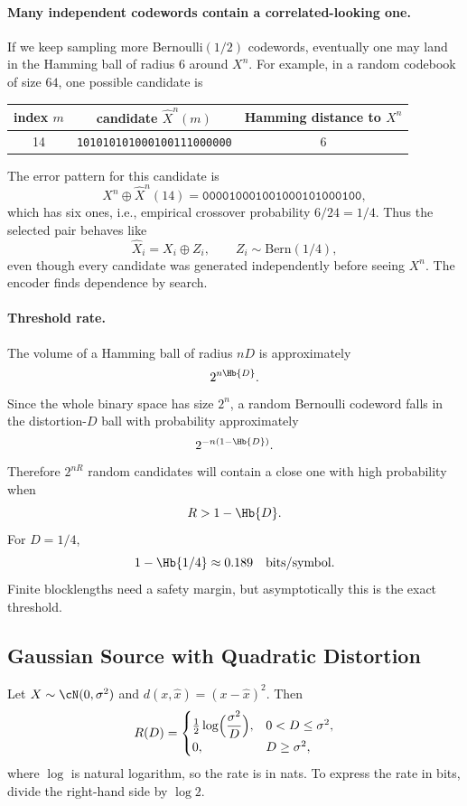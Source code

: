 \paragraph{Many independent codewords contain a correlated-looking one.}
If we keep sampling more Bernoulli$(1/2)$ codewords, eventually one may land in the Hamming ball of radius $6$ around $X^n$.
For example, in a random codebook of size $64$, one possible candidate is
\begin{center}
\begin{tabular}{c|c|c}
index $m$ & candidate $\widehat X^n(m)$ & Hamming distance to $X^n$ \\
\hline
14 & \texttt{101010101000100111000000} & 6
\end{tabular}
\end{center}
The error pattern for this candidate is
\[
X^n\oplus \widehat X^n(14)
=	\texttt{000010001001000101000100},
\]
which has six ones, i.e., empirical crossover probability $6/24=1/4$.
Thus the selected pair behaves like
\[
    \widehat X_i = X_i\oplus Z_i,
    \qquad Z_i\sim\mathrm{Bern}(1/4),
\]
even though every candidate was generated independently before seeing $X^n$.
The encoder finds dependence by search.

\paragraph{Threshold rate.}
The volume of a Hamming ball of radius $nD$ is approximately
\[
    2^{n\Hb{D}}.
\]
Since the whole binary space has size $2^n$, a random Bernoulli codeword falls in the distortion-$D$ ball with probability approximately
\[
    2^{-n(1-\Hb{D})}.
\]
Therefore $2^{nR}$ random candidates will contain a close one with high probability when
\[
    R>1-\Hb{D}.
\]
For $D=1/4$,
\[
    1-\Hb{1/4}\approx 0.189\quad\text{bits/symbol}.
\]
Finite blocklengths need a safety margin, but asymptotically this is the exact threshold.

\subsection{Gaussian Source with Quadratic Distortion}
\label{subsec:gaussian-rd}

Let $X\sim\cN(0,\sigma^2)$ and $d(x,\hat x)=(x-\hat x)^2$.
Then
\begin{equation}
R(D)=
\begin{cases}
\tfrac12\log\Bigl(\dfrac{\sigma^2}{D}\Bigr), & 0<D\le \sigma^2,\\[1mm]
0, & D\ge \sigma^2,
\end{cases}
\label{eq:gaussian-rd}
\end{equation}
where $\log$ is natural logarithm, so the rate is in nats.
To express the rate in bits, divide the right-hand side by $\log 2$.

